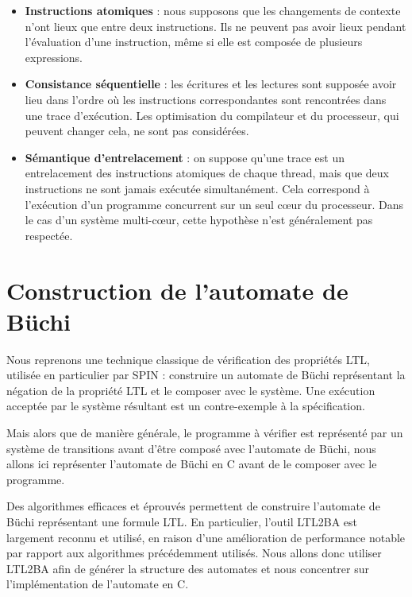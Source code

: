 \begin{itemize}
  \item \textbf{Instructions atomiques} : nous supposons que les changements de
    contexte n'ont lieux que entre deux instructions. Ils ne peuvent pas avoir
    lieux pendant l'évaluation d'une instruction, même si elle est composée de
    plusieurs expressions.
  \item \textbf{Consistance séquentielle} : les écritures et les lectures sont
    supposée avoir lieu dans l'ordre où les instructions correspondantes sont
    rencontrées dans une trace d'exécution. Les optimisation du compilateur et
    du processeur, qui peuvent changer cela, ne sont pas considérées.
  \item \textbf{Sémantique d'entrelacement} : on suppose qu'une trace est un
    entrelacement des instructions atomiques de chaque thread, mais que deux
    instructions ne sont jamais exécutée simultanément. Cela correspond à
    l'exécution d'un programme concurrent sur un seul c\oe{}ur du processeur. Dans
    le cas d'un système multi-c\oe{}ur, cette hypothèse n'est généralement pas
    respectée.
\end{itemize}

\section{Construction de l'automate de Büchi}

Nous reprenons une technique classique de vérification des propriétés \ac{LTL},
utilisée en particulier par SPIN\cite{SPIN} : construire un automate de Büchi
représentant la négation de la propriété \ac{LTL} et le composer avec le
système. Une exécution acceptée par le système résultant est un contre-exemple à
la spécification.

Mais alors que de manière générale, le programme à vérifier est représenté par
un système de transitions avant d'être composé avec l'automate de Büchi, nous
allons ici représenter l'automate de Büchi en C avant de le composer avec le
programme.

Des algorithmes efficaces et éprouvés permettent de construire l'automate de
Büchi représentant une formule \ac{LTL}. En particulier, l'outil
LTL2BA\cite{ltl2ba} est largement reconnu et utilisé, en raison d'une
amélioration de performance notable par rapport aux algorithmes précédemment utilisés.
Nous allons donc utiliser LTL2BA afin de générer la structure des automates et
nous concentrer sur l'implémentation de l'automate en C.

